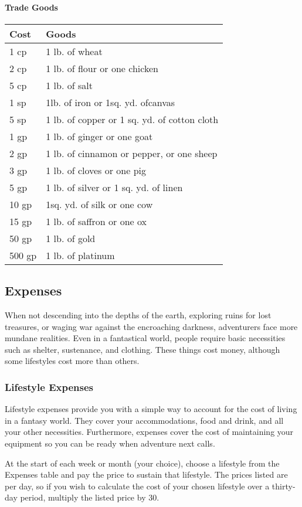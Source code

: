 \documentclass[
]{article}
\begin{document}
\hypertarget{trade-goods-2}{%
\paragraph{Trade Goods}\label{trade-goods-2}}

\begin{longtable}[]{@{}ll@{}}
\toprule
Cost & Goods\tabularnewline
\midrule
\endhead
1 cp & 1 lb. of wheat\tabularnewline
2 cp & 1 lb. of flour or one chicken\tabularnewline
5 cp & 1 lb. of salt\tabularnewline
1 sp & 1lb. of iron or 1sq. yd. ofcanvas\tabularnewline
5 sp & 1 lb. of copper or 1 sq. yd. of cotton cloth\tabularnewline
1 gp & 1 lb. of ginger or one goat\tabularnewline
2 gp & 1 lb. of cinnamon or pepper, or one sheep\tabularnewline
3 gp & 1 lb. of cloves or one pig\tabularnewline
5 gp & 1 lb. of silver or 1 sq. yd. of linen\tabularnewline
10 gp & 1sq. yd. of silk or one cow\tabularnewline
15 gp & 1 lb. of saffron or one ox\tabularnewline
50 gp & 1 lb. of gold\tabularnewline
500 gp & 1 lb. of platinum\tabularnewline
\bottomrule
\end{longtable}

\hypertarget{expenses}{%
\subsection{Expenses}\label{expenses}}

When not descending into the depths of the earth, exploring ruins for
lost treasures, or waging war against the encroaching darkness,
adventurers face more mundane realities. Even in a fantastical world,
people require basic necessities such as shelter, sustenance, and
clothing. These things cost money, although some lifestyles cost more
than others.

\hypertarget{lifestyle-expenses}{%
\subsubsection{Lifestyle Expenses}\label{lifestyle-expenses}}

Lifestyle expenses provide you with a simple way to account for the cost
of living in a fantasy world. They cover your accommodations, food and
drink, and all your other necessities. Furthermore, expenses cover the
cost of maintaining your equipment so you can be ready when adventure
next calls.

At the start of each week or month (your choice), choose a lifestyle
from the Expenses table and pay the price to sustain that lifestyle. The
prices listed are per day, so if you wish to calculate the cost of your
chosen lifestyle over a thirty-day period, multiply the listed price by
30.
\end{document}
